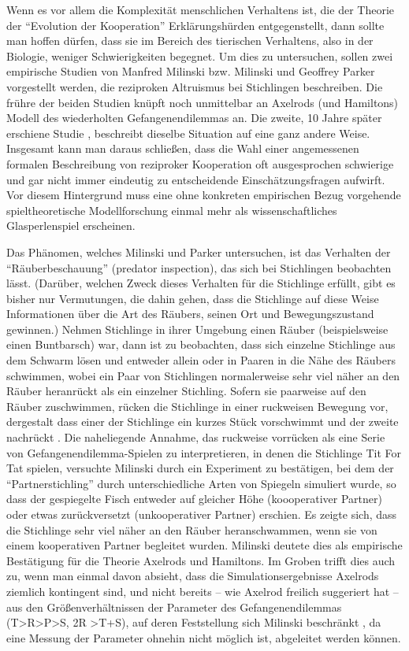 \documentclass[12pt,a4paper,ngerman]{article}
\begin{document}
Wenn es vor allem die Komplexität menschlichen Verhaltens ist, die der
Theorie der "`Evolution der Kooperation"' Erklärungshürden
entgegenstellt, dann sollte man hoffen dürfen, dass sie im Bereich des
tierischen Verhaltens, also in der Biologie, weniger Schwierigkeiten
begegnet. Um dies zu untersuchen, sollen zwei empirische Studien von
Manfred Milinski bzw. Milinski und Geoffrey Parker vorgestellt werden,
die reziproken Altruismus bei Stichlingen beschreiben. Die frühre der
beiden Studien \cite{milinski:1987} knüpft noch unmittelbar an
Axelrods (und Hamiltons) Modell des wiederholten Gefangenendilemmas
an. Die zweite, 10 Jahre später erschiene Studie
\cite{milinski-parker:1997}, beschreibt dieselbe Situation auf eine
ganz andere Weise. Insgesamt kann man daraus schließen, dass die Wahl
einer angemessenen formalen Beschreibung von reziproker Kooperation
oft ausgesprochen schwierige und gar nicht immer eindeutig zu
entscheidende Einschätzungsfragen aufwirft. Vor diesem Hintergrund
muss eine ohne konkreten empirischen Bezug vorgehende
spieltheoretische Modellforschung einmal mehr als wissenschaftliches
Glasperlenspiel erscheinen.

Das Phänomen, welches Milinski und Parker untersuchen, ist das
Verhalten der "`Räuberbeschauung"' (predator inspection), das sich bei
Stichlingen beobachten lässt. (Darüber, welchen Zweck dieses Verhalten
für die Stichlinge erfüllt, gibt es bisher nur Vermutungen, die dahin
gehen, dass die Stichlinge auf diese Weise Informationen über die Art
des Räubers, seinen Ort und Bewegungszustand gewinnen.)  Nehmen
Stichlinge in ihrer Umgebung einen Räuber (beispielsweise einen
Buntbarsch) war, dann ist zu beobachten, dass sich einzelne Stichlinge
aus dem Schwarm lösen und entweder allein oder in Paaren in die Nähe
des Räubers schwimmen, wobei ein Paar von Stichlingen normalerweise
sehr viel näher an den Räuber heranrückt als ein einzelner
Stichling. Sofern sie paarweise auf den Räuber zuschwimmen, rücken die
Stichlinge in einer ruckweisen Bewegung vor, dergestalt dass einer der
Stichlinge ein kurzes Stück vorschwimmt und der zweite
nachrückt \cite[S. 433]{milinski:1987}. Die naheliegende Annahme, das
ruckweise vorrücken als eine Serie von Gefangenendilemma-Spielen zu
interpretieren, in denen die Stichlinge Tit For Tat spielen, versuchte
Milinski durch ein Experiment zu bestätigen, bei dem der
"`Partnerstichling"' durch unterschiedliche Arten von Spiegeln
simuliert wurde, so dass der gespiegelte Fisch entweder auf gleicher
Höhe (koooperativer Partner) oder etwas zurückversetzt (unkooperativer
Partner) erschien. Es zeigte sich, dass die Stichlinge sehr viel näher
an den Räuber heranschwammen, wenn sie von einem kooperativen Partner
begleitet wurden. Milinski deutete dies als empirische Bestätigung für
die Theorie Axelrods und Hamiltons. Im Groben trifft dies auch zu,
wenn man einmal davon absieht, dass die Simulationsergebnisse Axelrods
ziemlich kontingent sind, und nicht bereits -- wie Axelrod freilich
suggeriert hat -- aus den Größenverhältnissen der Parameter des
Gefangenendilemmas (T>R>P>S, 2R >T+S), auf deren Feststellung sich
Milinski beschränkt \cite[S. 435]{milinski:1987}, da eine Messung der
Parameter ohnehin nicht möglich ist, abgeleitet werden können.
\end{document}
